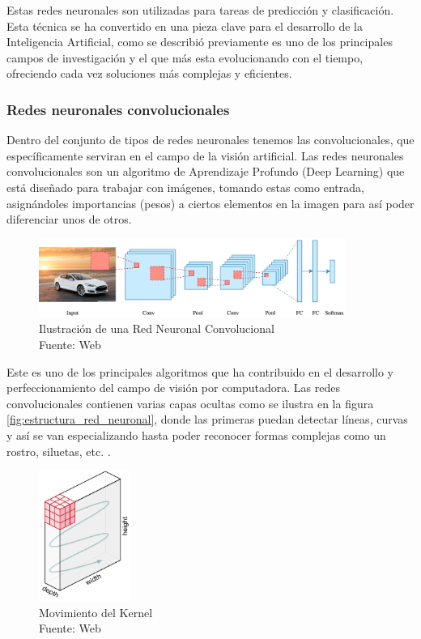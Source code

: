 Estas redes neuronales son utilizadas para tareas de predicción y clasificación. Esta técnica se ha convertido en una pieza clave para el desarrollo de la Inteligencia Artificial, como se describió previamente es uno de los principales campos de investigación y el que más esta evolucionando con el tiempo, ofreciendo cada vez soluciones más complejas y eficientes.

\subsubsection{Redes neuronales convolucionales}
Dentro del conjunto de tipos de redes neuronales tenemos las convolucionales, que específicamente serviran en el campo de la visión artificial. Las redes neuronales convolucionales son un algoritmo de Aprendizaje Profundo (Deep Learning) que está diseñado para trabajar con imágenes, tomando estas como entrada, asignándoles importancias (pesos) a ciertos elementos en la imagen para así poder diferenciar unos de otros.\\

\begin{figure}[H]
    \begin{center}
        \includegraphics[width=10cm]{img/capitulo_2/convolucional.png}
    \end{center}
    \caption{Ilustración de una Red Neuronal Convolucional
        \\Fuente: Web}
    \label{fig:red_neuronal_convolucional}
\end{figure}

Este es uno de los principales algoritmos que ha contribuido en el desarrollo y perfeccionamiento del campo de visión por computadora. Las redes convolucionales contienen varias capas ocultas como se ilustra en la figura \ref{fig:estructura_red_neuronal}, donde las primeras puedan detectar líneas, curvas y así se van especializando hasta poder reconocer formas complejas como un rostro, siluetas, etc. \cite{convolutional:ia}. \\

\begin{figure}[H]
    \begin{center}
        \includegraphics[width=3cm]{img/capitulo_2/kernel.png}
    \end{center}
    \caption{Movimiento del Kernel
        \\Fuente: Web}
    \label{fig:kernel}
\end{figure}

